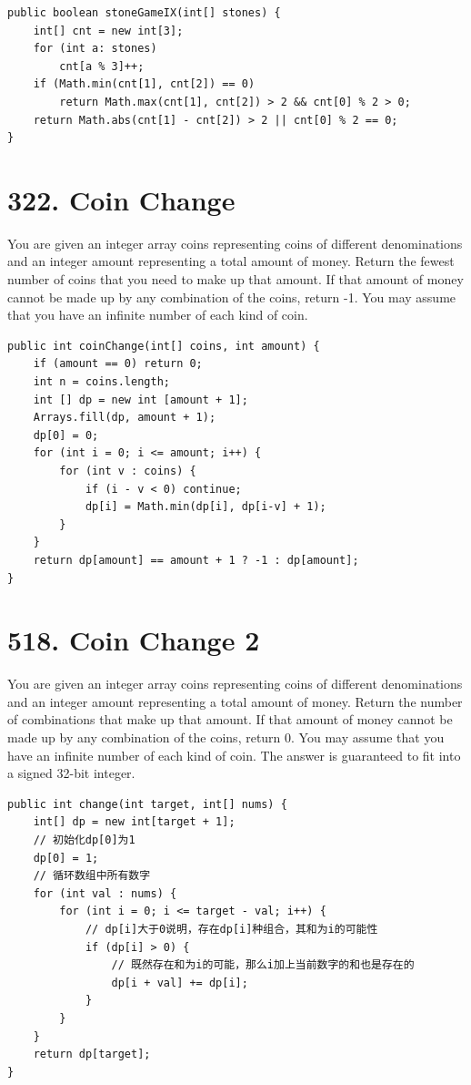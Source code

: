 \documentclass[9pt, b5paaper]{book}
\begin{document}
\begin{verbatim}
public boolean stoneGameIX(int[] stones) {
    int[] cnt = new int[3];
    for (int a: stones)
        cnt[a % 3]++;
    if (Math.min(cnt[1], cnt[2]) == 0)
        return Math.max(cnt[1], cnt[2]) > 2 && cnt[0] % 2 > 0;
    return Math.abs(cnt[1] - cnt[2]) > 2 || cnt[0] % 2 == 0;
}
\end{verbatim}
\section{322. Coin Change}
\label{sec-1-23}
You are given an integer array coins representing coins of different denominations and an integer amount representing a total amount of money.
Return the fewest number of coins that you need to make up that amount. If that amount of money cannot be made up by any combination of the coins, return -1.
You may assume that you have an infinite number of each kind of coin.
\begin{verbatim}
public int coinChange(int[] coins, int amount) {
    if (amount == 0) return 0;
    int n = coins.length;
    int [] dp = new int [amount + 1];
    Arrays.fill(dp, amount + 1);
    dp[0] = 0;
    for (int i = 0; i <= amount; i++) {
        for (int v : coins) {
            if (i - v < 0) continue;
            dp[i] = Math.min(dp[i], dp[i-v] + 1);
        }
    }
    return dp[amount] == amount + 1 ? -1 : dp[amount];
}
\end{verbatim}

\section{518. Coin Change 2}
\label{sec-1-24}
You are given an integer array coins representing coins of different denominations and an integer amount representing a total amount of money.
Return the number of combinations that make up that amount. If that amount of money cannot be made up by any combination of the coins, return 0.
You may assume that you have an infinite number of each kind of coin.
The answer is guaranteed to fit into a signed 32-bit integer.
\begin{verbatim}
public int change(int target, int[] nums) {
    int[] dp = new int[target + 1];
    // 初始化dp[0]为1
    dp[0] = 1;
    // 循环数组中所有数字
    for (int val : nums) {
        for (int i = 0; i <= target - val; i++) {
            // dp[i]大于0说明，存在dp[i]种组合，其和为i的可能性
            if (dp[i] > 0) {
                // 既然存在和为i的可能，那么i加上当前数字的和也是存在的
                dp[i + val] += dp[i];
            }
        }
    }
    return dp[target];
}
\end{verbatim}
\end{document}
